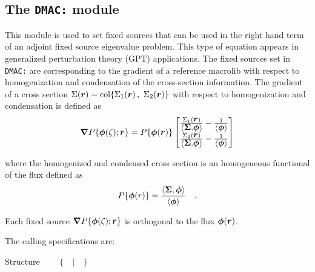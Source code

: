 \subsection{The {\tt DMAC:} module}\label{sect:DMACData}

This module is used to set fixed sources that can be used in the right hand term of an adjoint
fixed source eigenvalue problem. This type of equation appears in generalized perturbation theory (GPT) applications.
The fixed sources set in {\tt DMAC:} are corresponding to the gradient of a reference
macrolib with respect to homogenization and condensation of the cross-section information. The gradient
of a cross section $\Sigma(\bff(r))={\rm col}\{\Sigma_1(\bff(r)) \, , \ \Sigma_2(\bff(r))\}$ with respect to
homogenization and condensation is defined as
\begin{align*}
\bff(\nabla)P\{\bff(\phi)(\zeta);\bff(r)\}=P\{\bff(\phi)(\bff(r))\}
\left[\begin{matrix}{\Sigma_1(\bff(r))\over \left<\bff(\Sigma),\bff(\phi)\right>}-{1\over
\left<\bff(\phi)\right>} \cr {\Sigma_2(\bff(r))\over \left<\bff(\Sigma),\bff(\phi)\right>}-{1\over
\left<\bff(\phi)\right>}\end{matrix}\right]
\end{align*}

\noindent where the homogenized and condensed cross section is an homogeneous functional of the flux defined as
$$
P\{\bff(\phi)(r)\}={\left<\bff(\Sigma),\bff(\phi)\right>\over \left<\bff(\phi)\right>} \ \ \  .
$$

Each fixed source $\bff(\nabla)P\{\bff(\phi)(\zeta);\bff(r)\}$ is orthogonal to the flux $\bff(\phi)(\bff(r))$.

\vskip 0.02cm

The calling specifications are:

\begin{DataStructure}{Structure }
~\moc{:=}~~~$\{$~~$|$~~$\}$~~\moc{::}~ \\
\end{DataStructure}

